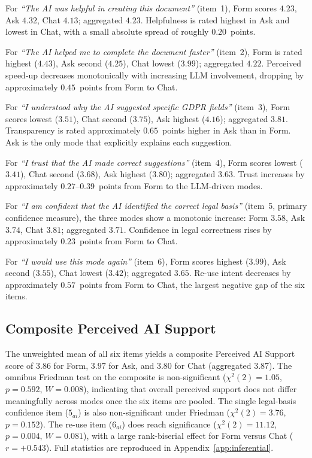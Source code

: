 For \emph{``The AI was helpful in creating this document''} (item~1),
Form scores $4.23$, Ask $4.32$, Chat $4.13$; aggregated $4.23$. Helpfulness
is rated highest in Ask and lowest in Chat, with a small absolute spread of
roughly $0.20$~points.

For \emph{``The AI helped me to complete the document faster''} (item~2),
Form is rated highest ($4.43$), Ask second ($4.25$), Chat lowest ($3.99$);
aggregated $4.22$. Perceived speed-up decreases monotonically with increasing
LLM involvement, dropping by approximately $0.45$~points from Form to Chat.

For \emph{``I understood why the AI suggested specific GDPR fields''}
(item~3), Form scores lowest ($3.51$), Chat second ($3.75$), Ask highest
($4.16$); aggregated $3.81$. Transparency is rated approximately
$0.65$~points higher in Ask than in Form. Ask is the only mode that
explicitly explains each suggestion.

For \emph{``I trust that the AI made correct suggestions''} (item~4), Form
scores lowest ($3.41$), Chat second ($3.68$), Ask highest ($3.80$); aggregated
$3.63$. Trust increases by approximately $0.27$--$0.39$~points from Form to
the LLM-driven modes.

For \emph{``I am confident that the AI identified the correct legal basis''}
(item~5, primary confidence measure), the three modes show a monotonic
increase: Form $3.58$, Ask $3.74$, Chat $3.81$; aggregated $3.71$. Confidence
in legal correctness rises by approximately $0.23$~points from Form to Chat.

For \emph{``I would use this mode again''} (item~6), Form scores highest
($3.99$), Ask second ($3.55$), Chat lowest ($3.42$); aggregated $3.65$.
Re-use intent decreases by approximately $0.57$~points from Form to Chat,
the largest negative gap of the six items.

\subsection{Composite Perceived AI Support}

The unweighted mean of all six items yields a composite Perceived AI Support
score of $3.86$ for Form, $3.97$ for Ask, and $3.80$ for Chat (aggregated
$3.87$). The omnibus Friedman test on the composite is non-significant
($\chi^2(2) = 1.05$, $p = 0.592$, $W = 0.008$), indicating that overall
perceived support does not differ meaningfully across modes once the six
items are pooled. The single legal-basis confidence item ($5_{ai}$) is also
non-significant under Friedman ($\chi^2(2) = 3.76$, $p = 0.152$). The re-use
item ($6_{ai}$) does reach significance ($\chi^2(2) = 11.12$, $p = 0.004$,
$W = 0.081$), with a large rank-biserial effect for Form versus Chat
($r = +0.543$). Full statistics are reproduced in
Appendix~\ref{app:inferential}.

